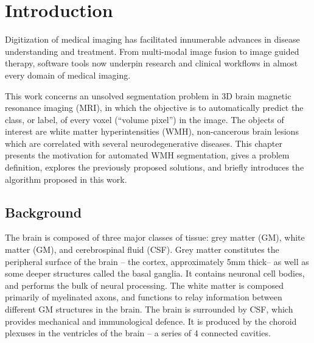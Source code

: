 \chapter{Introduction}\label{ch-intro}
Digitization of medical imaging has facilitated
innumerable advances in disease understanding and treatment.
From multi-modal image fusion to image guided therapy, software tools now underpin
research and clinical workflows in almost every domain of medical imaging.
\par
This work concerns an unsolved segmentation problem in 3D brain magnetic resonance imaging (MRI),
in which the objective is to automatically predict the
class, or label, of every voxel (``volume pixel'') in the image.
The objects of interest are white matter hyperintensities (WMH),
non-cancerous brain lesions which are correlated with several neurodegenerative diseases.
This chapter
presents the motivation for automated WMH segmentation,
gives a problem definition,
explores the previously proposed solutions,
and briefly introduces the algorithm proposed in this work.
\section{Background}
The brain is composed of three major classes of tissue:
grey matter (GM), white matter (GM), and cerebrospinal fluid (CSF).
Grey matter constitutes the peripheral surface of the brain
-- the cortex, approximately 5mm thick-- as well as some deeper structures called the basal ganglia.
It contains neuronal cell bodies, and performs the bulk of neural processing.
The white matter is composed primarily of myelinated axons,
and functions to relay information between different GM structures in the brain.
The brain is surrounded by CSF, which provides mechanical and immunological defence.
It is produced by the choroid plexuses in the ventricles of the brain
-- a series of 4 connected cavities.
